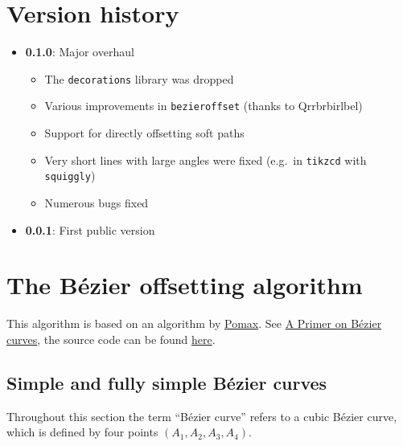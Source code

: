 \documentclass[12pt,a4paper]{article}
\theoremstyle{definition}
\begin{document}
\newpage
\section{Version history}

\begin{itemize}
  \item \textbf{0.1.0}: Major overhaul
  \begin{itemize}
    \item The \texttt{decorations} library was dropped
    \item Various improvements in \texttt{bezieroffset} (thanks to \hbox{Qrrbrbirlbel})
    \item Support for directly offsetting soft paths
    \item Very short lines with large angles were fixed (e.g.\ in \texttt{tikzcd} with \texttt{squiggly})
    \item Numerous bugs fixed
  \end{itemize}
  \item \textbf{0.0.1}: First public version
\end{itemize}

\appendix
\newpage
\section{The Bézier offsetting algorithm}

This algorithm is based on an algorithm by \href{https://github.com/Pomax/}{Pomax}. See \href{https://pomax.github.io/bezierinfo/#offsetting}{A Primer on Bézier curves}, the source code can be found \href{https://github.com/Pomax/bezierinfo/blob/bcfce2149fa5e5540a2a2605986adab3b2a9a3bf/js/graphics-element/lib/bezierjs/bezier.js}{here}.

\subsection{Simple and fully simple Bézier curves}

Throughout this section the term ``Bézier curve'' refers to a cubic Bézier curve, which is defined by four points $(A_1, A_2, A_3, A_4)$.
\end{document}
